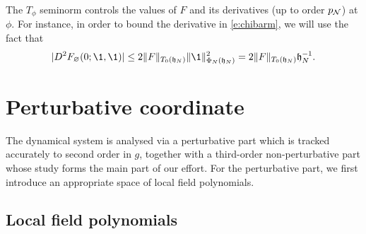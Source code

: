 The $T_\phi$ seminorm controls the values of $F$ and its derivatives (up to order
$p_{\mathcal{N}}$) at $\phi$. For instance, in order to bound the derivative in \eqref{e:chibarm},
we will use the fact that
\begin{equation}
\label{e:deriv-norm-bd}
|D^2 F_\varnothing(0; \1, \1)|
	\le
2 \|F\|_{T_0(\h_N)} \|\1\|^2_{\Phi_N(\h_N)}
	=
2 \|F\|_{T_0(\h_N)} \h_N^{-1}.
\end{equation}


\section{Perturbative coordinate}

The dynamical system is analysed via a perturbative part which is tracked accurately
to second order in $g$, together with a third-order non-perturbative part whose study
forms the main part of our effort.  For the perturbative part, we first introduce
an appropriate space of local field polynomials.


\subsection{Local field polynomials}

